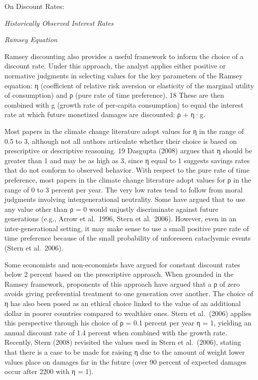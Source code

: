 \documentclass[
]{book}
\begin{document}
On Discount Rates:

\emph{Historically Observed Interest Rates}

\emph{Ramsey Equation}

Ramsey discounting also provides a useful framework to inform the choice of a discount rate.
Under this approach, the analyst applies either positive or normative judgments in selecting
values for the key parameters of the Ramsey equation: η (coefficient of relative risk aversion or
elasticity of the marginal utility of consumption) and ρ (pure rate of time preference). 18 These
are then combined with g (growth rate of per-capita consumption) to equal the interest rate at
which future monetized damages are discounted: ρ + η·g.

Most papers in the climate change literature adopt values for η in the range of 0.5 to 3, although
not all authors articulate whether their choice is based on prescriptive or descriptive reasoning. 19
Dasgupta (2008) argues that η should be greater than 1 and may be as high as 3, since η equal to
1 suggests savings rates that do not conform to observed behavior. With respect to the pure rate
of time preference, most papers in the climate change literature adopt values for ρ in the range of
0 to 3 percent per year. The very low rates tend to follow from moral judgments involving
intergenerational neutrality. Some have argued that to use any value other than ρ = 0 would
unjustly discriminate against future generations (e.g., Arrow et al.~1996, Stern et al.~2006).
However, even in an inter-generational setting, it may make sense to use a small positive pure
rate of time preference because of the small probability of unforeseen cataclysmic events (Stern
et al.~2006).

Some economists and non-economists have argued for constant discount rates below 2 percent
based on the prescriptive approach. When grounded in the Ramsey framework, proponents of
this approach have argued that a ρ of zero avoids giving preferential treatment to one generation
over another. The choice of η has also been posed as an ethical choice linked to the value of an
additional dollar in poorer countries compared to wealthier ones. Stern et al.~(2006) applies this
perspective through his choice of ρ = 0.1 percent per year η = 1, yielding an annual discount rate
of 1.4 percent when combined with the growth rate. Recently, Stern (2008) revisited the values
used in Stern et al.~(2006), stating that there is a case to be made for raising η due to the amount
of weight lower values place on damages far in the future (over 90 percent of expected damages
occur after 2200 with η = 1).
\end{document}
